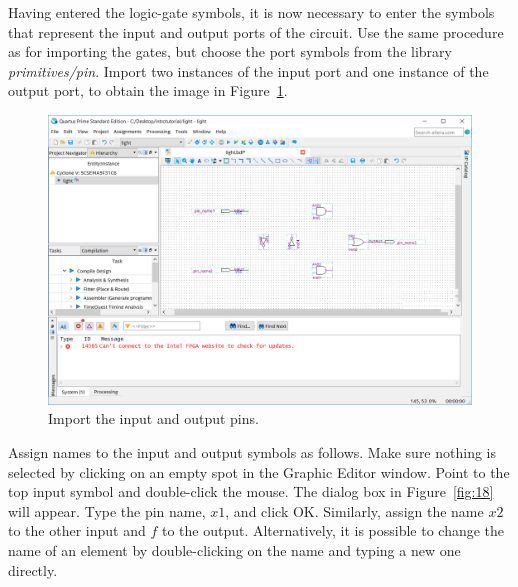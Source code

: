 \documentclass[11pt, twoside, pdftex]{article}
\begin{document}
Having entered the logic-gate symbols, it is now necessary to enter the
symbols that represent the input and output ports of the circuit.
Use the same procedure as for importing the gates, but choose the port 
symbols from the library {\it primitives/pin}.
Import two instances of the input port and one instance of the output port,
to obtain the image in Figure~\ref{fig:17}.

\begin{figure}[H]
   \begin{center}
      \includegraphics[scale=0.4]{figures/figure17.png}
   \caption{Import the input and output pins.} 
	 \label{fig:17}
	 \end{center}
\end{figure}

Assign names to the input and output symbols as follows.
Make sure nothing is selected by clicking on an empty spot in the Graphic Editor window.
Point to the top input symbol and double-click
the mouse. The dialog box in Figure~\ref{fig:18} will appear. Type the pin name, $x1$,
and click {\sf OK}. Similarly, assign the name $x2$ to the other input and $f$
to the output. Alternatively, it is possible to change the name of an element by
double-clicking on the name and typing a new one directly.
 
\end{document}
